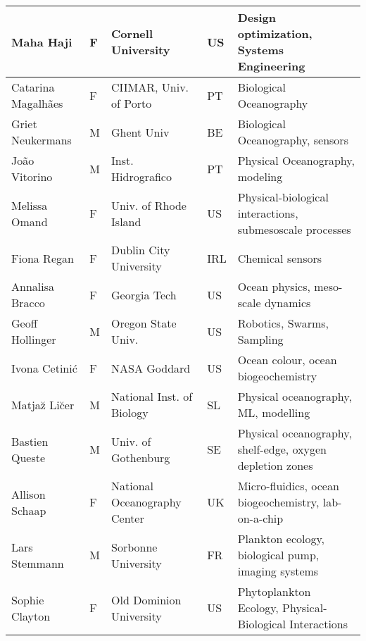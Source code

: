 \begin{table}[!t]
{\begin{tabular}{|p{3.5cm}|p{0.7cm}|p{4.0cm}|p{0.5cm}|p{6.0cm}|}
  \hline
  Maha Haji                & F   & Cornell University                              & US       & Design optimization, Systems Engineering                   \\
  \hline
  Catarina Magalh\~aes      & F   & CIIMAR, Univ. of Porto                & PT       & Biological Oceanography                         \\
  \hline
  Griet Neukermans             & M & Ghent Univ & BE  & Biological Oceanography, sensors\\
  \hline
  Jo\~ao Vitorino            & M   & Inst. Hidrografico                    & PT       & Physical Oceanography, modeling                    \\
  \hline
  Melissa Omand            & F   & Univ. of Rhode Island                 & US       & Physical-biological interactions, submesoscale processes\\
  \hline
  Fiona Regan & F & Dublin City University & IRL & Chemical sensors\\
  \hline
  Annalisa Bracco          & F   & Georgia Tech                          & US       & Ocean physics, meso-scale dynamics              \\
  \hline
  Geoff Hollinger          & M   & Oregon State Univ.                     & US       & Robotics, Swarms, Sampling                              \\
  \hline
  Ivona Cetini\'{c}        & F   & NASA Goddard                            & US       & Ocean colour, ocean biogeochemistry  \\
  \hline
  Matja\u{z} Li\u{c}er     & M   & National Inst. of Biology                 & SL & Physical oceanography, ML, modelling            \\
  \hline
  Bastien Queste           & M   & Univ. of Gothenburg & SE       &
                                                                 Physical
                                                                 oceanography,
                                                                 shelf-edge,
  oxygen depletion zones\\                            
  \hline
  Allison Schaap           & F   & National Oceanography Center              & UK       & Micro-fluidics, ocean biogeochemistry, lab-on-a-chip\\
  \hline
  Lars Stemmann            & M & Sorbonne University                     & FR & Plankton ecology, biological pump, imaging systems\\
  \hline
  Sophie Clayton           & F   & Old Dominion University              & US       & Phytoplankton Ecology, Physical-Biological Interactions\\

\end{tabular}}
\end{table}
